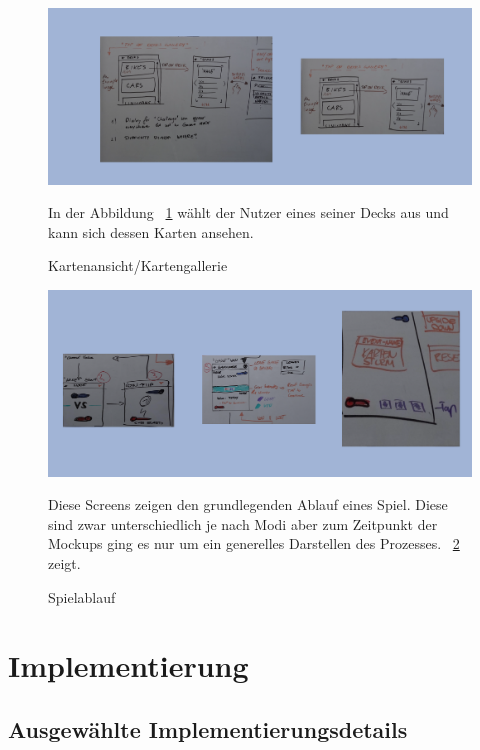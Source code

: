 \documentclass{scrartcl}
\begin{document}
\begin{figure}[!ht]
\begin{center}
	\includegraphics[scale=0.4]{pics/deckgallery.png}
	\caption{Kartenansicht/Kartengallerie}
	\label{DeckGallery}
\end{center}
In der Abbildung ~\ref{DeckGallery} wählt der Nutzer eines seiner Decks aus und kann sich dessen Karten ansehen.
\end{figure}

\begin{figure}[!ht]
\begin{center}
	\centering
	\includegraphics[scale=0.4]{pics/gameplay.png}
	\caption{Spielablauf}
	\label{gamePlay}
\end{center}
Diese Screens zeigen den grundlegenden Ablauf eines Spiel. Diese sind zwar unterschiedlich je nach Modi aber zum Zeitpunkt der Mockups ging es nur um ein generelles Darstellen des Prozesses.
~\ref{gamePlay} zeigt.
\end{figure}
\clearpage

\section{Implementierung}
\subsection{Ausgewählte Implementierungsdetails}
\end{document}
